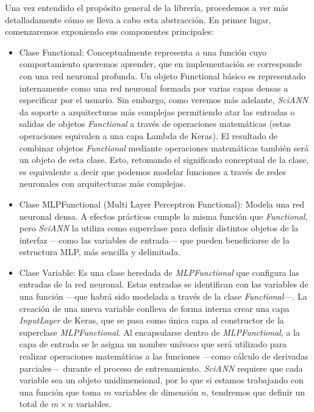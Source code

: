 Una vez entendido el propósito general de la librería, procedemos a ver más detalladamente cómo se lleva a cabo esta abstracción. En primer lugar, comenzaremos exponiendo sus componentes principales: 
\begin{itemize}
  
    \item Clase Functional: Conceptualmente representa a una función cuyo comportamiento queremos aprender, que en implementación se corresponde con una red neuronal profunda. Un objeto Functional básico es representado internamente como una red neuronal formada por varias capas densas a especificar por el usuario. Sin embargo, como veremos más adelante, \textit{SciANN} da soporte a arquitecturas más complejas permitiendo atar las entradas o salidas de objetos \textit{Functional} a través de operaciones matemáticas (estas operaciones equivalen a una capa Lambda de Keras). El resultado de combinar objetos \textit{Functional} mediante operaciones matemáticas también será un objeto de esta clase. Esto, retomando el significado conceptual de la clase, es equivalente a decir que podemos modelar funciones a través de redes neuronales con arquitecturas más complejas. 
    
    \item Clase MLPFunctional (Multi Layer Perceptron Functional): Modela una red neuronal densa. A efectos prácticos cumple la misma función que \textit{Functional},  pero \textit{SciANN} la utiliza como superclase para definir distintos objetos de la interfaz ---como las variables de entrada--- que pueden beneficiarse de la estructura MLP, más sencilla y delimitada. 
    
    \item Clase Variable: Es una clase heredada de \textit{MLPFunctional} que configura las entradas de la red neuronal. Estas entradas se identifican con las variables de una función ---que habrá sido modelada a través de la clase \textit{Functional}---. La creación de una nueva variable conlleva de forma interna crear una capa \textit{InputLayer} de Keras, que se pasa como única capa al constructor de la superclase \textit{MLPFunctional}. Al encapsularse dentro de \textit{MLPFunctional}, a la capa de entrada se le asigna un nombre unívoco que será utilizado para realizar operaciones matemáticas a las funciones ---como cálculo de derivadas parciales--- durante el proceso de entrenamiento. \textit{SciANN} requiere que cada variable sea un objeto unidimensional, por lo que si estamos trabajando con una función que toma $m$ variables de dimensión $n$, tendremos que definir un total de $m\times n$ variables. 
    

\end{itemize}
